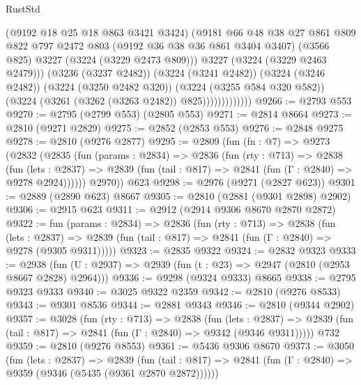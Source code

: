 \begin{lexlean}{RustStd}
\begin{coremodule}
                            (@9192 @18 @25 @18 @863 @3421 @3424)
                            (@9181
                              @66
                              @48
                              @38
                              @27
                              @861
                              @809
                              @822
                              @797
                              @2472
                              @803
                              (@9192 @36 @38 @36 @861 @3404 @3407)
                              (@3566 @825)
                              @3227
                              (@3224 (@3229 @2473 @809)))
                            @3227
                            (@3224 (@3229 @2463 @2479)))
                          (@3236 (@3237 @2482))
                          (@3224 (@3241 @2482))
                          (@3224 (@3246 @2482))
                          (@3224 (@3250 @2482 @320))
                          (@3224 (@3255 @584 @320 @582))
                          (@3224 (@3261 (@3262 (@3263 @2482)) @825)))))))))))))
@9266 := @2793 @553
@9270 := @2795 (@2799 @553) (@2805 @553)
@9271 := @2814 @8664
@9273 := @2810 (@9271 @2829)
@9275 := @2852 (@2853 @553)
@9276 := @2848 @9275
@9278 := @2810 (@9276 @2877)
@9295 := @2809
    (fun (fn : @7) =>
    @9273
      (@2832
        (@2835
          (fun (params : @2834) =>
          @2836
            (fun (rty : @713) =>
            @2838
              (fun (lets : @2837) =>
              @2839 (fun (tail : @817) => @2841 (fun (Γ : @2840) => @9278 @2924))))))
        @2970))
    @623
@9298 := @2976 (@9271 (@2827 @623))
@9301 := @2889 (@2890 @623) @8667
@9305 := @2810 (@2881 (@9301 @2898) @2902)
@9306 := @2915 @623
@9311 := @2912 (@2914 @9306 @8670 @2870 @2872)
@9322 := fun (params : @2834) =>
  @2836
    (fun (rty : @713) =>
    @2838
      (fun (lets : @2837) =>
      @2839 (fun (tail : @817) => @2841 (fun (Γ : @2840) => @9278 (@9305 @9311)))))
@9323 := @2835 @9322
@9324 := @2832 @9323
@9333 := @2938 (fun (U : @2937) => @2939 (fun (t : @23) => @2947 (@2810 (@2953 @8667 @2828) @2964)))
@9336 := @9298 (@9324 @9333) @8665
@9338 := @2795 @9323 @9333
@9340 := @3025 @9322 @2359
@9342 := @2810 (@9276 @8533)
@9343 := @9301 @8536
@9344 := @2881 @9343
@9346 := @2810 (@9344 @2902)
@9357 := @3028
    (fun (rty : @713) =>
    @2838
      (fun (lets : @2837) =>
      @2839 (fun (tail : @817) => @2841 (fun (Γ : @2840) => @9342 (@9346 @9311)))))
    @732
@9359 := @2810 (@9276 @8553)
@9361 := @5436 @9306 @8670
@9373 := @3050
    (fun (lets : @2837) =>
    @2839
      (fun (tail : @817) => @2841 (fun (Γ : @2840) => @9359 (@9346 (@5435 (@9361 @2870 @2872))))))

\end{coremodule}
\end{lexlean}
